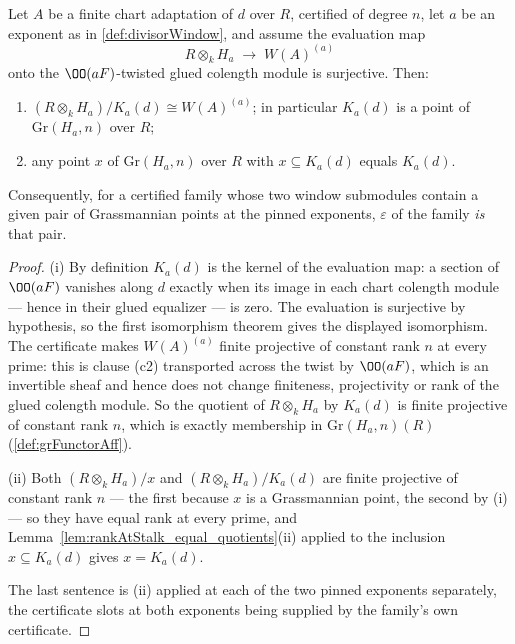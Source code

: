 \begin{theorem}
  \label{thm:divisorWindow_eq_of_le}
  \leanok
  Let \(A\) be a finite chart adaptation of \(d\) over \(R\), certified of degree \(n\), let
  \(a\) be an exponent as in \ref{def:divisorWindow}, and assume the evaluation map
  \[
    R \otimes_k H_a \;\longrightarrow\; W(A)^{(a)}
  \]
  onto the \(\OO(aF)\)-twisted glued colength module is surjective. Then:
  \begin{enumerate}
    \item \((R \otimes_k H_a)/K_a(d) \cong W(A)^{(a)}\); in particular \(K_a(d)\) is a point
      of \(\mathrm{Gr}(H_a, n)\) over \(R\);
    \item any point \(x\) of \(\mathrm{Gr}(H_a, n)\) over \(R\) with \(x \subseteq K_a(d)\)
      equals \(K_a(d)\).
  \end{enumerate}
  Consequently, for a certified family whose two window submodules contain a given pair of
  Grassmannian points at the pinned exponents, \(\varepsilon\) of the family \emph{is} that
  pair.
\end{theorem}
\begin{proof}
  \leanok
  (i) By definition \(K_a(d)\) is the kernel of the evaluation map: a section of
  \(\OO(aF)\) vanishes along \(d\) exactly when its image in each chart colength module ---
  hence in their glued equalizer --- is zero. The evaluation is surjective by hypothesis,
  so the first isomorphism theorem gives the displayed isomorphism. The certificate makes
  \(W(A)^{(a)}\) finite projective of constant rank \(n\) at every prime: this is clause
  (c2) transported across the twist by \(\OO(aF)\), which is an invertible sheaf and hence
  does not change finiteness, projectivity or rank of the glued colength module. So the
  quotient of \(R \otimes_k H_a\) by \(K_a(d)\) is finite projective of constant rank
  \(n\), which is exactly membership in \(\mathrm{Gr}(H_a, n)(R)\)
  (\ref{def:grFunctorAff}).

  (ii) Both \((R\otimes_k H_a)/x\) and \((R \otimes_k H_a)/K_a(d)\) are finite projective of
  constant rank \(n\) --- the first because \(x\) is a Grassmannian point, the second by
  (i) --- so they have equal rank at every prime, and
  Lemma~\ref{lem:rankAtStalk_equal_quotients}(ii) applied to the inclusion
  \(x \subseteq K_a(d)\) gives \(x = K_a(d)\).

  The last sentence is (ii) applied at each of the two pinned exponents separately, the
  certificate slots at both exponents being supplied by the family's own certificate.
\end{proof}

